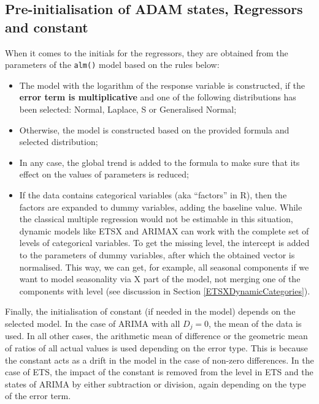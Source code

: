 \documentclass[]{book}
\providecommand{\tightlist}{%
  \setlength{\itemsep}{0pt}\setlength{\parskip}{0pt}}
\theoremstyle{definition}
\theoremstyle{definition}
\theoremstyle{definition}
\theoremstyle{definition}
\theoremstyle{remark}
\begin{document}
\hypertarget{pre-initialisation-of-adam-states-regressors-and-constant}{%
\subsection{Pre-initialisation of ADAM states, Regressors and constant}\label{pre-initialisation-of-adam-states-regressors-and-constant}}

When it comes to the initials for the regressors, they are obtained from the parameters of the \texttt{alm()} model based on the rules below:

\begin{itemize}
\tightlist
\item
  The model with the logarithm of the response variable is constructed, if the \textbf{error term is multiplicative} and one of the following distributions has been selected: Normal, Laplace, S or Generalised Normal;
\item
  Otherwise, the model is constructed based on the provided formula and selected distribution;
\item
  In any case, the global trend is added to the formula to make sure that its effect on the values of parameters is reduced;
\item
  If the data contains categorical variables (aka ``factors'' in R), then the factors are expanded to dummy variables, adding the baseline value. While the classical multiple regression would not be estimable in this situation, dynamic models like ETSX and ARIMAX can work with the complete set of levels of categorical variables. To get the missing level, the intercept is added to the parameters of dummy variables, after which the obtained vector is normalised. This way, we can get, for example, all seasonal components if we want to model seasonality via X part of the model, not merging one of the components with level (see discussion in Section \ref{ETSXDynamicCategories}).
\end{itemize}

Finally, the initialisation of constant (if needed in the model) depends on the selected model. In the case of ARIMA with all \(D_j=0\), the mean of the data is used. In all other cases, the arithmetic mean of difference or the geometric mean of ratios of all actual values is used depending on the error type. This is because the constant acts as a drift in the model in the case of non-zero differences. In the case of ETS, the impact of the constant is removed from the level in ETS and the states of ARIMA by either subtraction or division, again depending on the type of the error term.
\end{document}

